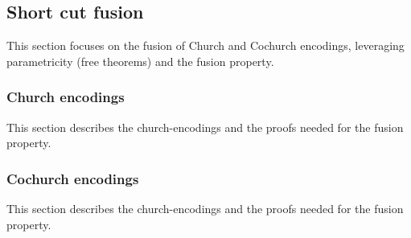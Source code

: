 \subsection{Short cut fusion}
This section focuses on the fusion of Church and Cochurch encodings, leveraging parametricity (free theorems) and the fusion property.
\subsubsection{Church encodings}
This section describes the church-encodings and the proofs needed for the fusion property.
\pagebreak






\subsubsection{Cochurch encodings}
This section describes the church-encodings and the proofs needed for the fusion property.


